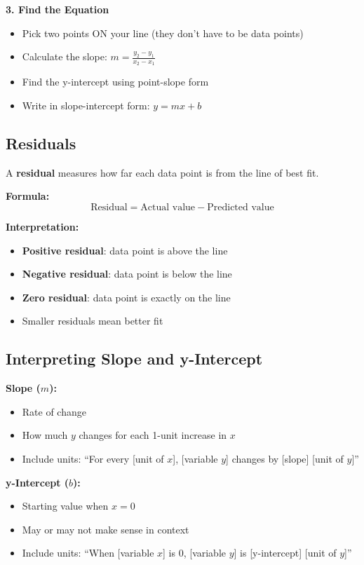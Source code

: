 \documentclass[12pt]{article}
\begin{document}
			\textbf{3. Find the Equation}
			\begin{itemize}
				\item Pick two points ON your line (they don't have to be data points)
				\item Calculate the slope: $m = \frac{y_2 - y_1}{x_2 - x_1}$
				\item Find the y-intercept using point-slope form
				\item Write in slope-intercept form: $y = mx + b$
			\end{itemize}

			\newpage

		\subsection*{Residuals}

			A \textbf{residual} measures how far each data point is from the line of best fit.

			\textbf{Formula:}
			$$\text{Residual} = \text{Actual value} - \text{Predicted value}$$

			\textbf{Interpretation:}
			\begin{itemize}
				\item \textbf{Positive residual}: data point is above the line
				\item \textbf{Negative residual}: data point is below the line
				\item \textbf{Zero residual}: data point is exactly on the line
				\item Smaller residuals mean better fit
			\end{itemize}

		\subsection*{Interpreting Slope and y-Intercept}

			\textbf{Slope ($m$):}
			\begin{itemize}
				\item Rate of change
				\item How much $y$ changes for each 1-unit increase in $x$
				\item Include units: ``For every [unit of $x$], [variable $y$] changes by [slope] [unit of $y$]''
			\end{itemize}

			\textbf{y-Intercept ($b$):}
			\begin{itemize}
				\item Starting value when $x = 0$
				\item May or may not make sense in context
				\item Include units: ``When [variable $x$] is 0, [variable $y$] is [y-intercept] [unit of $y$]''
			\end{itemize}
\end{document}
